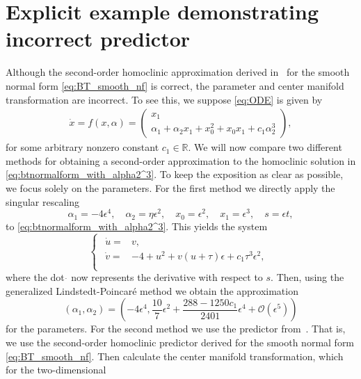 \section{Explicit example demonstrating incorrect predictor}
\label{app:incorrect_predictor}

Although the second-order homoclinic approximation derived
in~\cite{Al-Hdaibat2016} for the smooth normal form \cref{eq:BT_smooth_nf} is
correct, the parameter and center manifold transformation are incorrect. To see
this, we suppose \cref{eq:ODE} is given by
\begin{align}
\label{eq:btnormalform_with_alpha2^3}
\dot x = f(x,\alpha) = \begin{pmatrix}   x_1 \\
 \alpha_1 + \alpha_2 x_1 + x_0^2 + x_0 x_1 + c_1 \alpha_2^3
 \end{pmatrix},
\end{align}
for some arbitrary nonzero constant $c_1 \in \mathbb R$.  We will now compare
two different methods for obtaining a second-order approximation to the
homoclinic solution in \cref{eq:btnormalform_with_alpha2^3}. To keep the
exposition as clear as possible, we focus solely on the parameters. For the
first method we directly apply the singular rescaling 
\[
\alpha_1=-4\epsilon^4, \quad \alpha_2 = \eta \epsilon^2,
\quad x_0= \epsilon^2, \quad x_1= \epsilon^3, \quad
s=\epsilon t,
\]
to \cref{eq:btnormalform_with_alpha2^3}. This yields the system
\[
\begin{cases}
\begin{aligned}
  \dot u ={}& v, \\
  \dot v ={}& -4 + u^2 + v\left( u + \tau \right)\epsilon +  c_1 \tau^3
	\epsilon^2, \\
\end{aligned}
\end{cases}
\]
where the dot $\dot{}$ now represents the derivative with respect to $s$.
Then, using the generalized Lindstedt-Poincar\'e method we obtain the approximation
\begin{equation}
\label{eq:first_predictor}
				(\alpha_1, \alpha_2) = \left(-4 \epsilon^4, \frac{10}7 \epsilon^2 
+\frac{288-1250 c_1}{2401}\epsilon^4 + \mathcal O(\epsilon^5) \right)
\end{equation}
for the parameters. For the second method we use the predictor
from~\cite{Al-Hdaibat2016}. That is, we use the second-order homoclinic
predictor derived for the smooth normal form \cref{eq:BT_smooth_nf}. Then
calculate the center manifold transformation, which for the two-dimensional
